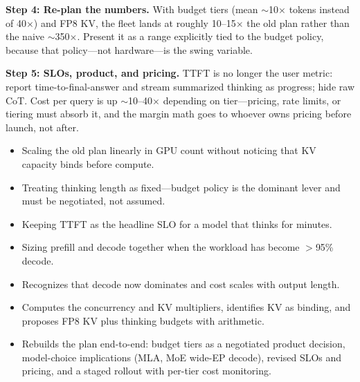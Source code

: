 \begin{interviewq}
\textbf{Step 4: Re-plan the numbers.} With budget tiers (mean $\sim$10$\times$ tokens instead of 40$\times$) and FP8 KV, the fleet lands at roughly 10--15$\times$ the old plan rather than the naive $\sim$350$\times$. Present it as a range explicitly tied to the budget policy, because that policy---not hardware---is the swing variable.

\textbf{Step 5: SLOs, product, and pricing.} TTFT is no longer the user metric: report time-to-final-answer and stream summarized thinking as progress; hide raw CoT. Cost per query is up $\sim$10--40$\times$ depending on tier---pricing, rate limits, or tiering must absorb it, and the margin math goes to whoever owns pricing before launch, not after.

\redflags
\begin{itemize}
    \item Scaling the old plan linearly in GPU count without noticing that KV capacity binds before compute.
    \item Treating thinking length as fixed---budget policy is the dominant lever and must be negotiated, not assumed.
    \item Keeping TTFT as the headline SLO for a model that thinks for minutes.
    \item Sizing prefill and decode together when the workload has become $>$95\% decode.
\end{itemize}


\goodgreat
\begin{itemize}
    \item {} Recognizes that decode now dominates and cost scales with output length.
    \item {} Computes the concurrency and KV multipliers, identifies KV as binding, and proposes FP8 KV plus thinking budgets with arithmetic.
    \item {} Rebuilds the plan end-to-end: budget tiers as a negotiated product decision, model-choice implications (MLA, MoE wide-EP decode), revised SLOs and pricing, and a staged rollout with per-tier cost monitoring.
\end{itemize}

\end{interviewq}

